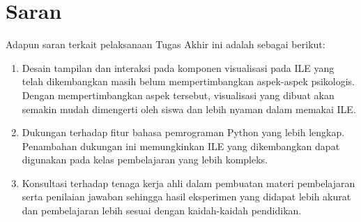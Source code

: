 \section{Saran}
Adapun saran terkait pelaksanaan Tugas Akhir ini adalah sebagai berikut:
\begin{enumerate}
  \item Desain tampilan dan interaksi pada komponen visualisasi pada ILE yang telah dikembangkan masih belum mempertimbangkan aspek-aspek psikologis. Dengan mempertimbangkan aspek tersebut, visualisasi yang dibuat akan semakin mudah dimengerti oleh siswa dan lebih nyaman dalam memakai ILE.
  \item Dukungan terhadap fitur bahasa pemrograman Python yang lebih lengkap. Penambahan dukungan ini memungkinkan ILE yang dikembangkan dapat digunakan pada kelas pembelajaran yang lebih kompleks.
  \item Konsultasi terhadap tenaga kerja ahli dalam pembuatan materi pembelajaran serta penilaian jawaban sehingga hasil eksperimen yang didapat lebih akurat dan pembelajaran lebih sesuai dengan kaidah-kaidah pendidikan.
\end{enumerate}